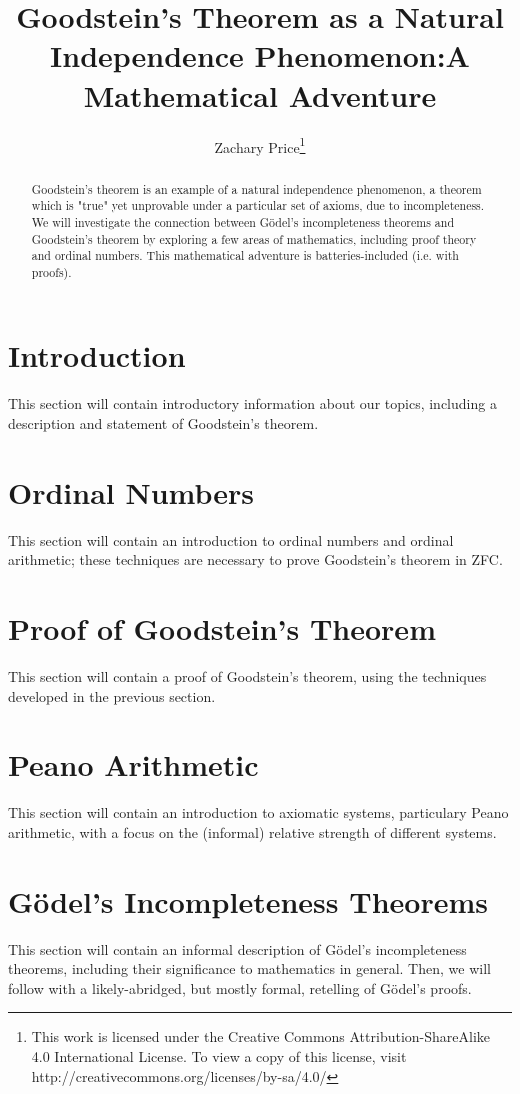 \documentclass[10pt]{article}
\title{Goodstein's Theorem as a Natural Independence Phenomenon:\newline A Mathematical Adventure}
\author{Zachary Price\footnote { 
\ccbysa \indent This work is licensed under the Creative Commons Attribution-ShareAlike 4.0 International License. To view a copy of this license, visit http://creativecommons.org/licenses/by-sa/4.0/
}}
\begin{document}
\maketitle

\newtheorem{define}{Definition}
\newtheorem{thm}{Theorem}
\newtheorem{lem}{Lemma}
\newtheorem{conj}{Conjecture}

\begin{abstract}
Goodstein's theorem is an example of a natural independence phenomenon, a theorem which is "true" yet unprovable under a particular set of axioms, due to incompleteness.
We will investigate the connection between G{\"o}del's incompleteness theorems and Goodstein's theorem by exploring a few areas of mathematics, including proof theory and ordinal numbers.
This mathematical adventure is batteries-included (i.e. with proofs).
\end{abstract}

\section{Introduction}
This section will contain introductory information about our topics, including a description and statement of Goodstein's theorem.

\section{Ordinal Numbers}
This section will contain an introduction to ordinal numbers and ordinal arithmetic; these techniques are necessary to prove Goodstein's theorem in ZFC.

\section{Proof of Goodstein's Theorem}
This section will contain a proof of Goodstein's theorem, using the techniques developed in the previous section.

\section{Peano Arithmetic}
This section will contain an introduction to axiomatic systems, particulary Peano arithmetic, with a focus on the (informal) relative strength of different systems.

\section{G{\"o}del's Incompleteness Theorems}
This section will contain an informal description of G{\"o}del's incompleteness theorems, including their significance to mathematics in general.
Then, we will follow with a likely-abridged, but mostly formal, retelling of G{\"o}del's proofs.
\end{document}
